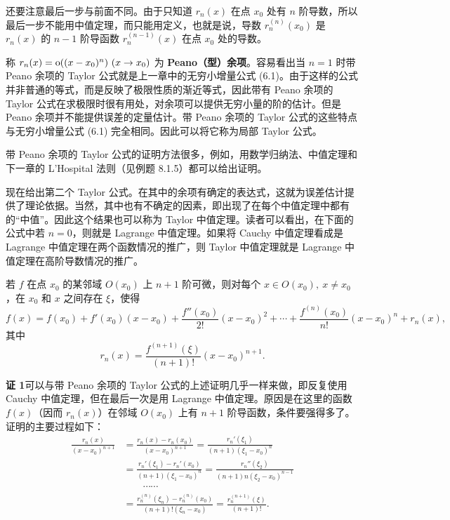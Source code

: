 \begin{xproof}
还要注意最后一步与前面不同。由于只知道 $r_n(x)$ 在点 $x_0$ 处有 $n$ 阶导数，所以最后一步不能用中值定理，而只能用定义，也就是说，导数 $r_n^{(n)}(x_0)$ 是 $r_n(x)$ 的 $n-1$ 阶导函数 $r_n^{(n-1)}(x)$ 在点 $x_0$ 处的导数。
\end{xproof}

\begin{xremark}
称 $r_n(x)=\mathrm{o}((x-x_0)^n)\ (x\to x_0)$ 为 \textbf{Peano（型）余项}。容易看出当 $n=1$ 时带 Peano 余项的 Taylor 公式就是上一章中的无穷小增量公式 (6.1)。由于这样的公式并非普通的等式，而是反映了极限性质的渐近等式，因此带有 Peano 余项的 Taylor 公式在求极限时很有用处，对余项可以提供无穷小量的阶的估计。但是 Peano 余项并不能提供误差的定量估计。带 Peano 余项的 Taylor 公式的这些特点与无穷小增量公式 (6.1) 完全相同。因此可以将它称为局部 Taylor 公式。
\end{xremark}

\begin{xremark}
带 Peano 余项的 Taylor 公式的证明方法很多，例如，用数学归纳法、中值定理和下一章的 L'Hospital 法则（见例题 8.1.5）都可以给出证明。
\end{xremark}

现在给出第二个 Taylor 公式。在其中的余项有确定的表达式，这就为误差估计提供了理论依据。当然，其中也有不确定的因素，即出现了在每个中值定理中都有的“中值”。因此这个结果也可以称为 Taylor 中值定理。读者可以看出，在下面的公式中若 $n=0$，则就是 Lagrange 中值定理。如果将 Cauchy 中值定理看成是 Lagrange 中值定理在两个函数情况的推广，则 Taylor 中值定理就是 Lagrange 中值定理在高阶导数情况的推广。

\begin{xproposition}
若 $f$ 在点 $x_0$ 的某邻域 $O(x_0)$ 上 $n+1$ 阶可微，则对每个 $x\in O(x_0),\ x\neq x_0$，在 $x_0$ 和 $x$ 之间存在 $\xi$，使得
\[
  f(x)=f(x_0)+f'(x_0)(x-x_0)+\frac{f''(x_0)}{2!}(x-x_0)^2+\cdots+\frac{f^{(n)}(x_0)}{n!}(x-x_0)^n+r_n(x),
\]
其中
\[
  r_n(x)=\frac{f^{(n+1)}(\xi)}{(n+1)!}(x-x_0)^{n+1}.
\]
\end{xproposition}
\begin{xproof}
\textbf{证 1}\quad 可以与带 Peano 余项的 Taylor 公式的上述证明几乎一样来做，即反复使用 Cauchy 中值定理，但在最后一次是用 Lagrange 中值定理。原因是在这里的函数 $f(x)$（因而 $r_n(x)$）在邻域 $O(x_0)$ 上有 $n+1$ 阶导函数，条件要强得多了。证明的主要过程如下：
\[
  \begin{aligned}
  \frac{r_n(x)}{(x-x_0)^{n+1}}
  &=\frac{r_n(x)-r_n(x_0)}{(x-x_0)^{n+1}}
   =\frac{r_n'(\xi_1)}{(n+1)(\xi_1-x_0)^n}\\
  &=\frac{r_n'(\xi_1)-r_n'(x_0)}{(n+1)(\xi_1-x_0)^n}
   =\frac{r_n''(\xi_2)}{(n+1)n(\xi_2-x_0)^{n-1}}\\
  &\qquad\cdots\cdots\\
  &=\frac{r_n^{(n)}(\xi_n)-r_n^{(n)}(x_0)}{(n+1)!(\xi_n-x_0)}
   =\frac{r_n^{(n+1)}(\xi)}{(n+1)!}.
  \end{aligned}
\]
\end{xproof}


